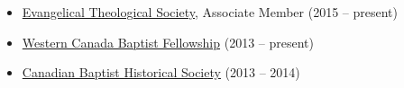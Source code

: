 
\begin{itemize}
\item \href{http://www.etsjets.org/}{Evangelical Theological Society}, Associate Member (2015 -- present)
\item \href{http://wcbf.net/}{Western Canada Baptist Fellowship} (2013 -- present)
\item \href{https://www.facebook.com/canadianbaptisthistory}{Canadian Baptist Historical Society} (2013 -- 2014)
\end{itemize}

